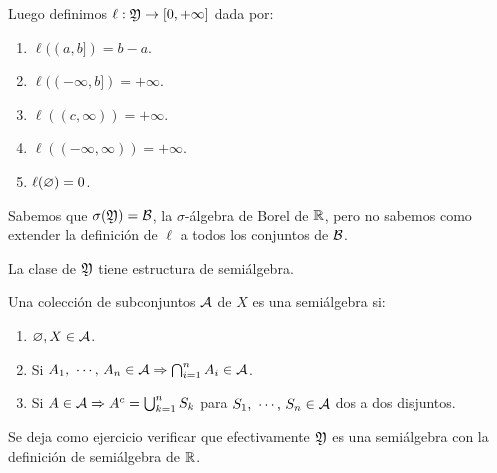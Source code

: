 Luego definimos $\ell: \mathfrak{Y} \to [0, +\infty]$ dada por: \begin{enumerate}
    \item $\ell((a, b]) = b - a$.
    \item $\ell((-\infty, b]) = +\infty$.
    \item $\ell((c, \infty)) = +\infty$.
    \item $\ell((-\infty, \infty)) = +\infty$.
    \item $\ell(\varnothing) = 0$. 
\end{enumerate}

Sabemos que $\sigma(\mathfrak{Y}) = \mathcal{B}$, la $\sigma$-álgebra de Borel de $\mathbb{R}$, pero no sabemos como extender la definición de $\ell$ a todos los conjuntos de $\mathcal{B}$.

La clase de $\mathfrak{Y}$ tiene estructura de semiálgebra.

\begin{definition}[Semiálgebra]
    Una colección de subconjuntos $\mathcal{A}$ de $X$ es una semiálgebra si: \begin{enumerate}
        \item $\varnothing, X \in \mathcal{A}$.
        \item Si $A_1 \text{, } \cdots \text{, } A_n \in \mathcal{A} \Rightarrow \bigcap_{i = 1}^n A_i \in \mathcal{A}$.
        \item Si $A \in \mathcal{A} \Rightarrow A^c = \bigcup_{k = 1}^n S_k$ para $S_1\text{, } \cdots \text{, } S_n \in \mathcal{A}$ dos a dos disjuntos.
    \end{enumerate}
\end{definition}

Se deja como ejercicio verificar que efectivamente $\mathfrak{Y}$ es una semiálgebra con la definición de semiálgebra de $\mathbb{R}$.

